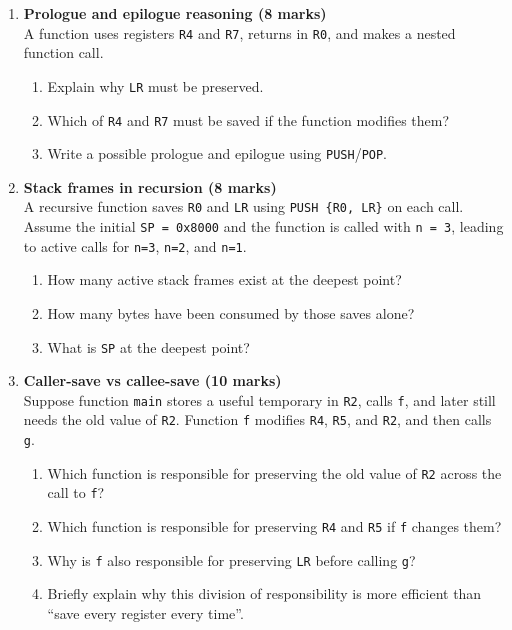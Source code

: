 \documentclass[11pt]{article}
\begin{document}
\begin{enumerate}[label=\textbf{B\arabic*.}]
  \item \textbf{Prologue and epilogue reasoning (8 marks)}\\
  A function uses registers \texttt{R4} and \texttt{R7}, returns in \texttt{R0}, and makes a nested function call.
  \begin{enumerate}[label=(\alph*)]
    \item Explain why \texttt{LR} must be preserved.
    \item Which of \texttt{R4} and \texttt{R7} must be saved if the function modifies them?
    \item Write a possible prologue and epilogue using \texttt{PUSH}/\texttt{POP}.
  \end{enumerate}

  \item \textbf{Stack frames in recursion (8 marks)}\\
  A recursive function saves \texttt{R0} and \texttt{LR} using \texttt{PUSH \{R0, LR\}} on each call.
  Assume the initial \texttt{SP = 0x8000} and the function is called with \texttt{n = 3}, leading to active calls for \texttt{n=3}, \texttt{n=2}, and \texttt{n=1}.
  \begin{enumerate}[label=(\alph*)]
    \item How many active stack frames exist at the deepest point?
    \item How many bytes have been consumed by those saves alone?
    \item What is \texttt{SP} at the deepest point?
  \end{enumerate}

  \item \textbf{Caller-save vs callee-save (10 marks)}\\
  Suppose function \texttt{main} stores a useful temporary in \texttt{R2}, calls \texttt{f}, and later still needs the old value of \texttt{R2}. Function \texttt{f} modifies \texttt{R4}, \texttt{R5}, and \texttt{R2}, and then calls \texttt{g}.
  \begin{enumerate}[label=(\alph*)]
    \item Which function is responsible for preserving the old value of \texttt{R2} across the call to \texttt{f}?
    \item Which function is responsible for preserving \texttt{R4} and \texttt{R5} if \texttt{f} changes them?
    \item Why is \texttt{f} also responsible for preserving \texttt{LR} before calling \texttt{g}?
    \item Briefly explain why this division of responsibility is more efficient than ``save every register every time''.
  \end{enumerate}
\end{enumerate}
\end{document}
